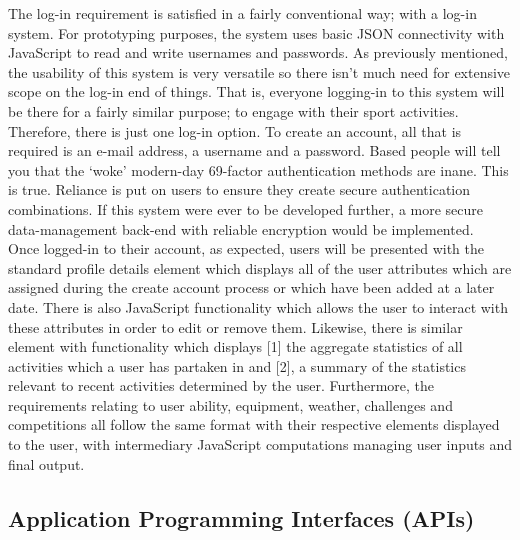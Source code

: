 \documentclass[11pt, english]{article}
\begin{document}
	The log-in requirement is satisfied in a fairly conventional way; with a log-in system. For prototyping purposes, the system uses basic JSON connectivity with JavaScript to read and write usernames and passwords. As previously mentioned, the usability of this system is very versatile so there isn't much need for extensive scope on the log-in end of things. That is, everyone logging-in to this system will be there for a fairly similar purpose; to engage with their sport activities. Therefore, there is just one log-in option. To create an account, all that is required is an e-mail address, a username and a password. Based people will tell you that the `woke' modern-day 69-factor authentication methods are inane. This is true. Reliance is put on users to ensure they create secure authentication combinations. If this system were ever to be developed further, a more secure data-management back-end with reliable encryption would be implemented.\\

	Once logged-in to their account, as expected, users will be presented with the standard profile details element which displays all of the user attributes which are assigned during the create account process or which have been added at a later date. There is also JavaScript functionality which allows the user to interact with these attributes in order to edit or remove them. Likewise, there is similar element with functionality which displays [1] the aggregate statistics of all activities which a user has partaken in and [2], a summary of the statistics relevant to recent activities determined by the user. Furthermore, the requirements relating to user ability, equipment, weather, challenges and competitions all follow the same format with their respective elements displayed to the user, with intermediary JavaScript computations managing user inputs and final output.

	\subsection{Application Programming Interfaces (APIs)}
\end{document}
